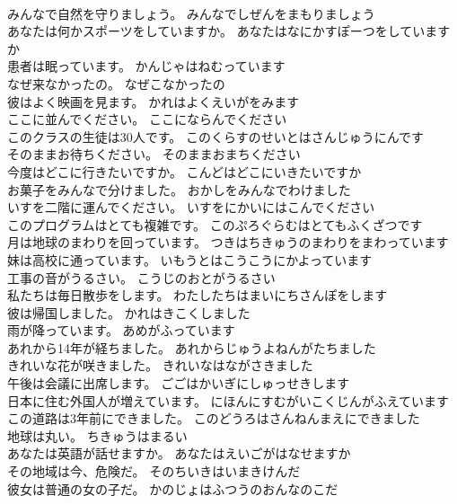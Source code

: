 \documentclass[8pt]{extreport}
\begin{document}
\begin{CJK}{UTF8}{min}
\\	みんなで自然を守りましょう。	みんなでしぜんをまもりましょう 
\\	あなたは何かスポーツをしていますか。	あなたはなにかすぽーつをしていますか 
\\	患者は眠っています。	かんじゃはねむっています 
\\	なぜ来なかったの。	なぜこなかったの 
\\	彼はよく映画を見ます。	かれはよくえいがをみます 
\\	ここに並んでください。	ここにならんでください 
\\	このクラスの生徒は30人です。	このくらすのせいとはさんじゅうにんです 
\\	そのままお待ちください。	そのままおまちください 
\\	今度はどこに行きたいですか。	こんどはどこにいきたいですか 
\\	お菓子をみんなで分けました。	おかしをみんなでわけました 
\\	いすを二階に運んでください。	いすをにかいにはこんでください 
\\	このプログラムはとても複雑です。	このぷろぐらむはとてもふくざつです 
\\	月は地球のまわりを回っています。	つきはちきゅうのまわりをまわっています 
\\	妹は高校に通っています。	いもうとはこうこうにかよっています 
\\	工事の音がうるさい。	こうじのおとがうるさい 
\\	私たちは毎日散歩をします。	わたしたちはまいにちさんぽをします 
\\	彼は帰国しました。	かれはきこくしました 
\\	雨が降っています。	あめがふっています 
\\	あれから14年が経ちました。	あれからじゅうよねんがたちました 
\\	きれいな花が咲きました。	きれいなはながさきました 
\\	午後は会議に出席します。	ごごはかいぎにしゅっせきします 
\\	日本に住む外国人が増えています。	にほんにすむがいこくじんがふえています 
\\	この道路は3年前にできました。	このどうろはさんねんまえにできました 
\\	地球は丸い。	ちきゅうはまるい 
\\	あなたは英語が話せますか。	あなたはえいごがはなせますか 
\\	その地域は今、危険だ。	そのちいきはいまきけんだ 
\\	彼女は普通の女の子だ。	かのじょはふつうのおんなのこだ 

\end{CJK}
\end{document}

